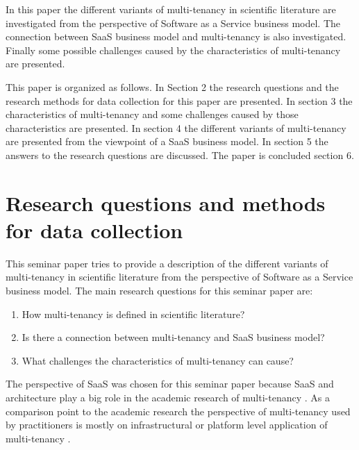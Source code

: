 \documentclass[conference]{sasmoota2017}
\begin{document}
In this paper the different variants of multi-tenancy in scientific literature are investigated from the perspective of Software as a Service business model. The connection between SaaS business model and multi-tenancy is also investigated. Finally some possible challenges caused by the characteristics of multi-tenancy are presented.

This paper is organized as follows. In Section 2 the research questions and the research methods for data collection for this paper are presented. In section 3 the characteristics of multi-tenancy and some challenges caused by those characteristics are presented. In section 4 the different variants of multi-tenancy are presented from the viewpoint of a SaaS business model. In section 5 the answers to the research questions are discussed. The paper is concluded section 6. 








\section{Research questions and methods for data collection}

This seminar paper tries to provide a description of the different variants of multi-tenancy in scientific literature from the perspective of Software as a Service business model. The main research questions for this seminar paper are: 
\begin{enumerate}
\item How multi-tenancy is defined in scientific literature?
\item Is there a connection between multi-tenancy and SaaS business model?
\item What challenges the characteristics of multi-tenancy can cause?
\end{enumerate}
The perspective of SaaS was chosen for this seminar paper because SaaS and architecture play a big role in the academic research of multi-tenancy \cite{Kabbedijk2015:Defining}. As a comparison point to the academic research the perspective of multi-tenancy used by practitioners is mostly on infrastructural or platform level application of multi-tenancy \cite{Kabbedijk2015:Defining}. 
\end{document}
